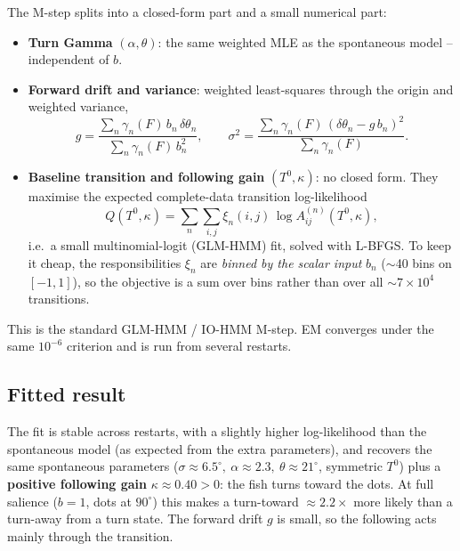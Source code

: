 \documentclass{article}
\newcommand{\plotph}[1]{%
  \begin{center}\fbox{\parbox[c][3.5cm][c]{0.85\linewidth}{%
  \centering\itshape [Plot placeholder: #1]}}\end{center}}
\begin{document}
The M-step splits into a closed-form part and a small numerical part:
\begin{itemize}
  \item \textbf{Turn Gamma} $(\alpha,\theta)$: the same weighted MLE as the
        spontaneous model -- independent of $b$.
  \item \textbf{Forward drift and variance}: weighted least-squares through the
        origin and weighted variance,
        \[
        g=\frac{\sum_n \gamma_n(F)\,b_n\,\delta\theta_n}
               {\sum_n \gamma_n(F)\,b_n^{2}},\qquad
        \sigma^2=\frac{\sum_n \gamma_n(F)\,(\delta\theta_n-g\,b_n)^2}
                      {\sum_n \gamma_n(F)} .
        \]
  \item \textbf{Baseline transition and following gain} $(T^0,\kappa)$: no closed
        form. They maximise the expected complete-data transition
        log-likelihood
        \[
        Q(T^0,\kappa)=\sum_n\sum_{i,j}\xi_n(i,j)\,
        \log A^{(n)}_{ij}(T^0,\kappa),
        \]
        i.e.\ a small multinomial-logit (GLM-HMM) fit, solved with L-BFGS. To
        keep it cheap, the responsibilities $\xi_n$ are \emph{binned by the
        scalar input} $b_n$ ($\sim$40 bins on $[-1,1]$), so the objective is a
        sum over bins rather than over all $\sim7\times10^{4}$ transitions.
\end{itemize}
This is the standard GLM-HMM / IO-HMM M-step. EM converges under the same
$10^{-6}$ criterion and is run from several restarts.

\subsection{Fitted result}
The fit is stable across restarts, with a slightly higher log-likelihood than the
spontaneous model (as expected from the extra parameters), and recovers the same
spontaneous parameters ($\sigma\approx6.5^\circ,\ \alpha\approx2.3,\
\theta\approx21^\circ$, symmetric $T^0$) plus a \textbf{positive following gain}
$\kappa\approx0.40>0$: the fish turns toward the dots. At full salience
($b=1$, dots at $90^\circ$) this makes a turn-toward $\approx2.2\times$ more
likely than a turn-away from a turn state. The forward drift $g$ is small, so the
following acts mainly through the transition.

\plotph{Following bias: $P(\text{turn}\pm\mid\text{turn state})$ vs.\ input
        $b=\sin\phi$ (the $\kappa$ effect), and emissions vs.\ data (notebook
        \texttt{fit\_hmm\_stim.ipynb}, Sect.~3).}
\end{document}

